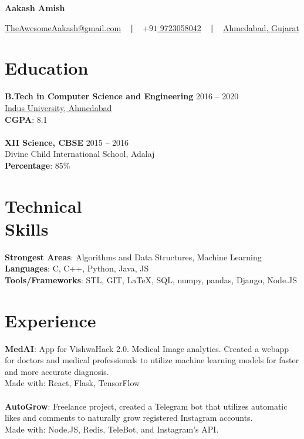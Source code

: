 \documentclass[margin, centered]{res}
\begin{document}
	\begin{center}
		\hspace{-\hoffset}
		\huge\bf{Aakash Amish}
	\end{center}
	\begin{center}
		\hspace{-\hoffset}
		\href{mailto:theawesomeaakash@gmail.com}{TheAwesomeAakash@gmail.com}
		~ \textbf{|} ~
		\href{tel:+919723058042}{\(+91\) 9723058042}
		~ \textbf{|} ~
		\href{https://goo.gl/maps/QqRrJzxewF82}{Ahmedabad, Gujarat}
	\end{center}

	\begin{resume}
		\section{Education}
			\textbf{B.Tech in Computer Science and Engineering} \hfill 2016 – 2020 \\
			\href{https://www.indusuni.ac.in/}{Indus University, Ahmedabad}\\
			\textbf{CGPA}: 8.1 \\ 
			\\
			\textbf{XII Science, CBSE} \hfill 2015 – 2016 \\
			Divine Child International School, Adalaj \\
			\textbf{Percentage}: 85\%
		
		\section{Technical \\ Skills}
			\textbf{Strongest Areas}: Algorithms and Data Structures, Machine Learning\\
			\textbf{Languages}: C, C++, Python, Java, JS\\
			\textbf{Tools/Frameworks}: STL, GIT, \LaTeX, SQL, numpy, pandas, Django, Node.JS
		
		\section{Experience}
			\textbf{MedAI}:
			App for VishwaHack 2.0. Medical Image analytics. Created a webapp for doctors and medical professionals to utilize machine learning models for faster and more accurate diagnosis.\\
			Made with: React, Flask, TensorFlow
			\\ \\
			\textbf{AutoGrow}:
			Freelance project, created a Telegram bot that utilizes automatic likes and comments to naturally grow registered Instagram accounts.\\
			Made with: Node.JS, Redis, TeleBot, and Instagram's API.
		

\end{resume}
\end{document}

